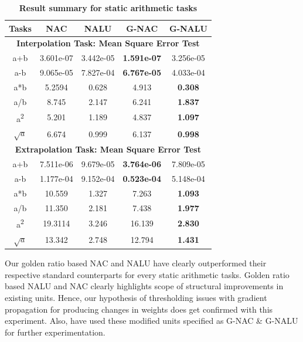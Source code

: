 \documentclass[conference]{IEEEtran}
\begin{document}
\bgroup
\def\arraystretch{1.5}
\begin{table}[h!]
  \begin{center}
    \caption{\textbf{Result summary for static arithmetic tasks}}
    \label{tab:table1}
    \begin{tabular}{|c|c|c|c|c|}
    
    \hline
      \textbf{Tasks} & \textbf{NAC} & \textbf{NALU} & \textbf{G-NAC} & \textbf{G-NALU}\\
    \hline    
      \multicolumn{5}{c}{\textbf{Interpolation Task: Mean Square Error Test}} \\
    \hline
      a+b & 3.601e-07 & 3.442e-05 & \textbf{1.591e-07} & 3.256e-05 \\
    \hline
      a-b & 9.065e-05 & 7.827e-04 &  \textbf{6.767e-05} & 4.033e-04\\
    \hline
      a*b & 5.2594 & 0.628 & 4.913 & \textbf{0.308} \\
    \hline
      a/b & 8.745 & 2.147 & 6.241 & \textbf{1.837} \\
    \hline
      a\textsuperscript{2} & 5.201 & 1.189 & 4.837 & \textbf{1.097}\\
    \hline
      $\sqrt{a}$ & 6.674 & 0.999 & 6.137 & \textbf{0.998}\\

    \hline    
      \multicolumn{5}{c}{\textbf{Extrapolation Task: Mean Square Error Test}} \\
    \hline
      a+b & 7.511e-06 & 9.679e-05 & \textbf{3.764e-06} & 7.809e-05 \\
    \hline
      a-b & 1.177e-04 & 9.152e-04 & \textbf{0.523e-04} & 5.148e-04 \\
    \hline
      a*b & 10.559 & 1.327 & 7.263 & \textbf{1.093} \\
    \hline
      a/b & 11.350 & 2.181 & 7.438 & \textbf{1.977} \\
    \hline
      a\textsuperscript{2} & 19.3114 & 3.246 & 16.139 & \textbf{2.830}\\
    \hline
      \textbf{$\sqrt{a}$} & 13.342 & 2.748 & 12.794 & \textbf{1.431}\\
    \hline 
    \end{tabular}
  \end{center}
\end{table}
\egroup

Our golden ratio based NAC and NALU have clearly outperformed their respective standard counterparts for every static arithmetic tasks. Golden ratio based NALU and NAC clearly highlights scope of structural improvements in existing units. Hence, our hypothesis of thresholding issues with gradient propagation for producing changes in weights does get confirmed with this experiment. Also, have used these modified units specified as G-NAC \& G-NALU for further experimentation.
\end{document}
